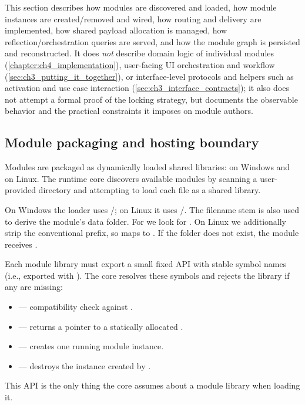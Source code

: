 This section describes how modules are discovered and loaded, how module instances are created/removed and wired, how routing and delivery are implemented, how shared payload allocation is managed, how reflection/orchestration queries are served, and how the module graph is persisted and reconstructed.
It does \emph{not} describe domain logic of individual modules (\autoref{chapter:ch4_implementation}), user-facing UI orchestration and workflow (\autoref{sec:ch3_putting_it_together}), or interface-level protocols and helpers such as activation and use case interaction (\autoref{sec:ch3_interface_contracts}); it also does not attempt a formal proof of the locking strategy, but documents the observable behavior and the practical constraints it imposes on module authors.


\subsection{Module packaging and hosting boundary} \label{subsec:ch3_core_dll_boundary}

Modules are packaged as dynamically loaded shared libraries:  on Windows and  on Linux. The runtime core discovers available modules by scanning a user-provided  directory and attempting to load each file as a shared library.

On Windows the loader uses /; on Linux it uses /. The filename stem is also used to derive the module's data folder. For  we look for . On Linux we additionally strip the conventional  prefix, so  maps to . If the folder does not exist, the module receives .

Each module library must export a small fixed API with stable symbol names (i.e., exported with ). The core resolves these symbols and rejects the library if any are missing:
\begin{itemize}
  \item {} --- compatibility check against .
  \item {} --- returns a pointer to a statically allocated .
  \item {} --- creates one running module instance.
  \item {} --- destroys the instance created by .
\end{itemize}
This API is the only thing the core assumes about a module library when loading it.

